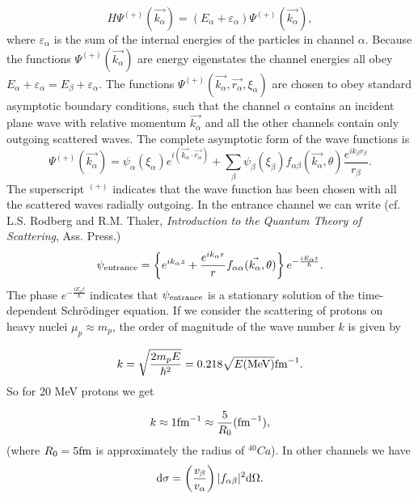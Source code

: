 \begin{equation}
H \Psi^{(+)}(\vec{k_{\alpha}}) = (E_{\alpha}+\varepsilon_{\alpha}) \Psi^{(+)} (\vec{k_{\alpha}}),
\end{equation}
 where $\varepsilon_{\alpha}$ is the sum of the internal energies of the particles in channel $\alpha$. Because the functions $\Psi^{(+)}(\vec{k_{\alpha}})$ are energy eigenstates the channel energies all obey $E_{\alpha}+\varepsilon_{\alpha}=E_{\beta}+\varepsilon_{\alpha}$. The functions $\Psi^{(+)}(\vec{k_{\alpha}},\vec{r_{\alpha}}, \xi_{\alpha})$ are chosen to obey standard asymptotic boundary conditions, such that the channel $\alpha$ contains an incident plane wave with relative momentum $\vec{k_{\alpha}}$ and all the other channels contain only outgoing scattered waves. The complete asymptotic form of the wave functions is
\begin{equation}\label{eq2nd_2}
\Psi^{(+)}(\vec{k_{\alpha}}) = \psi_{\alpha}(\xi_{\alpha})e^{i(\vec{k_{\alpha}} \cdot \vec{r_{\alpha}})} + \sum_{\beta} \psi_{\beta} (\xi_{\beta}) f_{\alpha \beta}(\vec{k_{\alpha}},\theta) \frac{e^{i k_{\beta} r_{\beta}}}{r_{\beta}}.
\end{equation}
 The superscript $^{(+)}$ indicates that the wave function has been chosen with all the scattered waves radially outgoing. In the entrance channel we can write (cf. L.S. Rodberg and R.M. Thaler, {\it Introduction to the Quantum Theory of Scattering}, Ass. Press.)
\begin{equation}
\psi_{\rm entrance} = \left\{ e^{i k_{\alpha} z} + \frac{e^{i k_{\alpha} r}}{r} f_{\alpha \alpha}(\vec{k_{\alpha}}, \theta) \right\} e^{-\frac{i E_{\alpha} t}{\hbar}}.
\end{equation}
The phase $e^{-\frac{i E_{\alpha} t}{\hbar}}$ indicates that $\psi_{\rm entrance}$ is a stationary solution of the time-dependent Schr\"odinger equation. If we consider the scattering of protons on heavy nuclei $\mu_p \approx m_p$, the order of magnitude of the wave number $k$ is given by

\begin{equation}
k = \sqrt{\frac{2 m_p E}{\hbar^2}} = 0.218 \sqrt{E({\rm MeV})} {\rm fm}^{-1}.
\end{equation}
So for 20 MeV protons we get

\begin{equation}
k \approx 1 {\rm fm}^{-1} \approx \frac{5}{R_0} ({\rm fm}^{-1}),
\end{equation}
 (where $R_0 = 5 {\rm fm}$ is approximately the radius of $^{40}Ca$).
In other channels we have
\begin{equation}\label{eq2nd_3}
{\rm d}\sigma = \left( \frac{v_{\beta}}{v_{\alpha}} \right) |f_{\alpha \beta}|^2 {\rm d}\Omega.
\end{equation}

